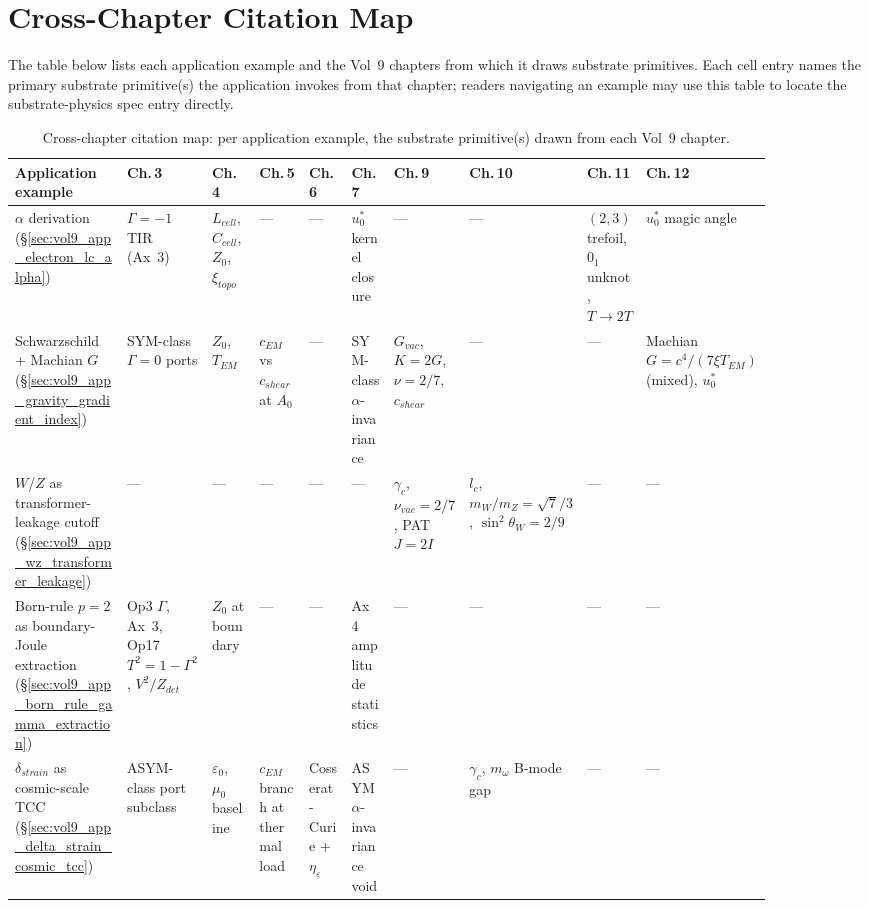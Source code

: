 \section{Cross-Chapter Citation Map}
\label{sec:vol9_app_cross_chapter_citation_map}

The table below lists each application example and the Vol~9 chapters from which it draws substrate primitives. Each cell entry names the primary substrate primitive(s) the application invokes from that chapter; readers navigating an example may use this table to locate the substrate-physics spec entry directly.

\begin{table}[htbp]
\centering
\renewcommand{\arraystretch}{1.40}
\footnotesize
\setlength{\tabcolsep}{3pt}
\begin{tabular}{@{}p{0.21\linewidth} p{0.075\linewidth} p{0.075\linewidth} p{0.075\linewidth} p{0.075\linewidth} p{0.075\linewidth} p{0.075\linewidth} p{0.075\linewidth} p{0.075\linewidth} p{0.075\linewidth}@{}}
\toprule
\textbf{Application example} & \textbf{Ch.\,3} & \textbf{Ch.\,4} & \textbf{Ch.\,5} & \textbf{Ch.\,6} & \textbf{Ch.\,7} & \textbf{Ch.\,9} & \textbf{Ch.\,10} & \textbf{Ch.\,11} & \textbf{Ch.\,12} \\
\midrule
$\alpha$ derivation (\S\ref{sec:vol9_app_electron_lc_alpha}) & $\Gamma=-1$\gammaundeclared{} TIR (Ax~3) & $L_{cell}$, $C_{cell}$, $Z_0$, $\xi_{topo}$ & --- & --- & $u_0^*$ kernel closure & --- & --- & $(2,3)$ trefoil, $0_1$ unknot, $T \to 2T$ & $u_0^*$ magic angle \\
Schwarzschild + Machian $G$ (\S\ref{sec:vol9_app_gravity_gradient_index}) & SYM-class $\Gamma=0$ ports & $Z_0$, $T_{EM}$ & $c_{EM}$ vs $c_{shear}$ at $A_0$ & --- & SYM-class $\alpha$-invariance & $G_{vac}$, $K=2G$, $\nu=2/7$, $c_{shear}$ & --- & --- & Machian $G = c^4/(7\xi T_{EM})$ (mixed), $u_0^*$ \\
$W$/$Z$ as transformer-leakage cutoff (\S\ref{sec:vol9_app_wz_transformer_leakage}) & --- & --- & --- & --- & --- & $\gamma_c$, $\nu_{vac}=2/7$, PAT $J=2I$ & $l_c$, $m_W/m_Z = \sqrt{7}/3$, $\sin^2\theta_W = 2/9$ & --- & --- \\
Born-rule $p=2$ as boundary-Joule extraction (\S\ref{sec:vol9_app_born_rule_gamma_extraction}) & Op3 $\Gamma$, Ax~3, Op17 $T^2=1-\Gamma^2$, $V^2/Z_{det}$ & $Z_0$ at boundary & --- & --- & Ax~4 amplitude statistics & --- & --- & --- & --- \\
$\delta_{strain}$ as cosmic-scale TCC (\S\ref{sec:vol9_app_delta_strain_cosmic_tcc}) & ASYM-class port subclass & $\varepsilon_0$, $\mu_0$ baseline & $c_{EM}$ branch at thermal load & Cosserat-Curie + $\eta_\varepsilon$ & ASYM $\alpha$-invariance void & --- & $\gamma_c$, $m_\omega$ B-mode gap & --- & --- \\
\bottomrule
\end{tabular}
\renewcommand{\arraystretch}{1.0}
\caption{Cross-chapter citation map: per application example, the substrate primitive(s) drawn from each Vol~9 chapter.}
\label{tab:vol9_app_citation_map}
\end{table}


